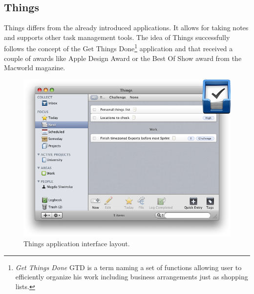 \subsection{Things}\label{subsec:things} 
Things differs from the already introduced applications. It allows for taking notes and supports other task management tools. The idea of Things successfully follows the concept of the Get Things Done\footnote{\textit{Get Things Done} GTD is a term naming a set of functions allowing user to efficiently organize his work including business arrangements just as shopping lists.} application and that received a couple of awards like Apple Design Award or the Best Of Show award from the Macworld magazine. 
\begin{figure}[ht]
\begin{center}
\includegraphics[scale=0.38]{img/things_demo.png}
\caption{Things application interface layout.}
\label{fig:things_demo}
\end{center}
\end{figure}
 

